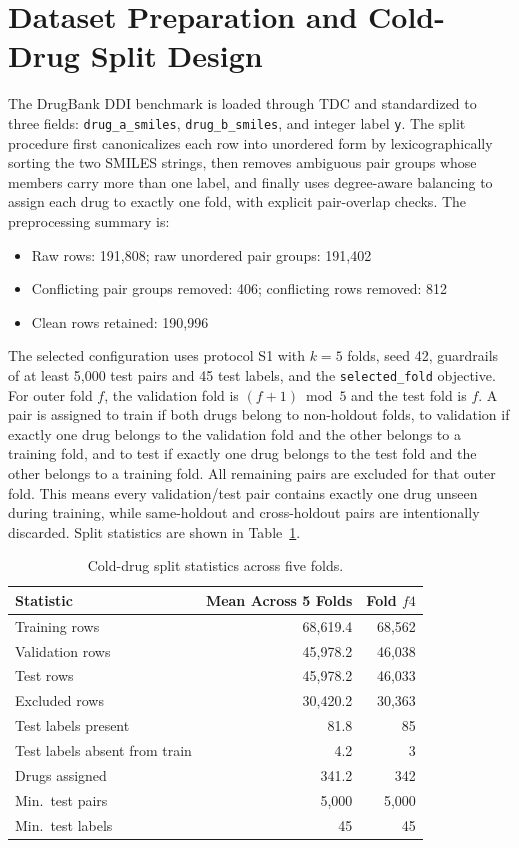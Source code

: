 \documentclass[11pt,a4paper]{report}
\begin{document}
\section{Dataset Preparation and Cold-Drug Split Design}

The DrugBank DDI benchmark is loaded through TDC and standardized to three fields: \texttt{drug\_a\_smiles}, \texttt{drug\_b\_smiles}, and integer label \texttt{y}. The split procedure first canonicalizes each row into unordered form by lexicographically sorting the two SMILES strings, then removes ambiguous pair groups whose members carry more than one label, and finally uses degree-aware balancing to assign each drug to exactly one fold, with explicit pair-overlap checks. The preprocessing summary is:
\begin{itemize}
\item Raw rows: 191{,}808; raw unordered pair groups: 191{,}402
\item Conflicting pair groups removed: 406; conflicting rows removed: 812
\item Clean rows retained: 190{,}996
\end{itemize}
The selected configuration uses protocol S1 with $k=5$ folds, seed 42, guardrails of at least 5{,}000 test pairs and 45 test labels, and the \texttt{selected\_fold} objective. For outer fold $f$, the validation fold is $(f+1)\bmod 5$ and the test fold is $f$. A pair is assigned to train if both drugs belong to non-holdout folds, to validation if exactly one drug belongs to the validation fold and the other belongs to a training fold, and to test if exactly one drug belongs to the test fold and the other belongs to a training fold. All remaining pairs are excluded for that outer fold. This means every validation/test pair contains exactly one drug unseen during training, while same-holdout and cross-holdout pairs are intentionally discarded. Split statistics are shown in Table~\ref{tab:split_stats}.

\begin{table}[H]
\centering
\caption{Cold-drug split statistics across five folds.}
\label{tab:split_stats}
\begin{tabular}{lrr}
\toprule
Statistic & Mean Across 5 Folds & Fold $f4$ \\
\midrule
Training rows        & 68{,}619.4 & 68{,}562 \\
Validation rows      & 45{,}978.2 & 46{,}038 \\
Test rows            & 45{,}978.2 & 46{,}033 \\
Excluded rows        & 30{,}420.2 & 30{,}363 \\
Test labels present  & 81.8       & 85       \\
Test labels absent from train & 4.2 & 3 \\
Drugs assigned       & 341.2      & 342      \\
Min.\ test pairs     & 5{,}000    & 5{,}000  \\
Min.\ test labels    & 45         & 45       \\
\bottomrule
\end{tabular}
\end{table}
\end{document}
